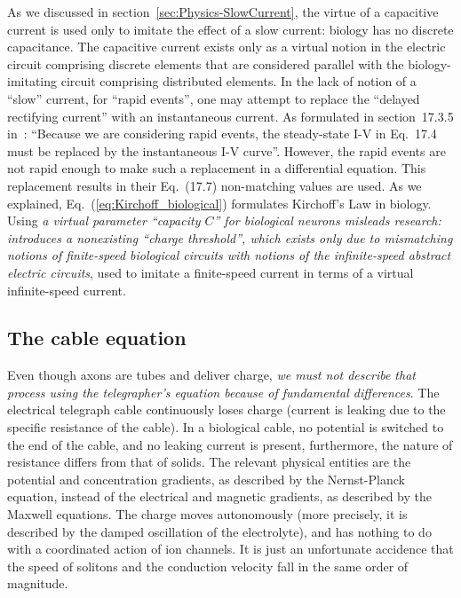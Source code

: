 As we discussed in section~\ref{sec:Physics-SlowCurrent},
the virtue of a capacitive current is used only to imitate the effect
of a slow current: biology has no discrete capacitance. The capacitive
current exists only as a virtual notion in the electric circuit comprising
discrete elements that are considered parallel with the biology-imitating
circuit comprising distributed elements. In the lack of notion of
a ``slow'' current, for ``rapid events'', one may attempt to replace
the ``delayed rectifying current'' with an instantaneous current.
As formulated in section~17.3.5 in~\cite{KochBiophysics:1999}:
``Because we are considering rapid events, the steady-state I-V in
Eq.~17.4 must be replaced by the instantaneous I-V curve''. However,
the rapid events are not rapid enough to make such a replacement in
a differential equation. This replacement results in their Eq.~(17.7)
non-matching values are used. As we explained, Eq.~(\ref{eq:Kirchoff_biological})
formulates Kirchoff's Law in biology. Using \emph{a virtual parameter
	``capacity $C$'' for biological neurons misleads research: introduces
	a nonexisting ``charge threshold'', which exists only due to mismatching
	notions of finite-speed biological circuits with notions of the infinite-speed
	abstract electric circuits}, used to imitate a finite-speed current
in terms of a virtual infinite-speed current.%

\subsection{The cable equation\label{sec:Physics-CableEquation}}

Even though axons are tubes and deliver
charge, \emph{we must not describe that process using the telegrapher's
	equation because of fundamental differences}. The electrical telegraph
cable continuously loses charge (current is leaking due to the specific
resistance of the cable).  In a biological cable, no potential
is switched to the end of the cable, and no leaking current is present, furthermore, the nature of resistance differs from
that of solids. The relevant physical
entities are the potential and concentration gradients, as described by
the Nernst-Planck equation, instead of the electrical and magnetic gradients,
as described by the Maxwell equations.
The charge moves autonomously (more precisely, it is described by the damped oscillation of the electrolyte), and has nothing to do with a coordinated action of ion channels. It is just an unfortunate accidence that the speed of solitons and the conduction velocity fall in the same order of magnitude.
